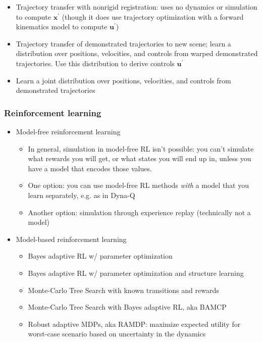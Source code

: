 \documentclass[12pt]{article}
\begin{document}
\begin{itemize}
\item Trajectory transfer with nonrigid registration: uses no dynamics or simulation to compute $\textbf{x}^\prime$ (though it does use trajectory optimization with a forward kinematics model to compute $\textbf{u}^\prime$) \citep{Schulman2013a}
\item Trajectory transfer of demonstrated trajectories to new scene; learn a distribution over positions, velocities, and controls from warped demonstrated trajectories. Use this distribution to derive controls $\textbf{u}^\prime$ \citep{Lee2015}
\item Learn a joint distribution over positions, velocities, and controls from demonstrated trajectories \citep{Paraschos2015}
\end{itemize}

\subsubsection*{Reinforcement learning}

\begin{itemize}
\item Model-free reinforcement learning
    \begin{itemize}
    \item In general, simulation in model-free RL isn't possible: you can't simulate what rewards you will get, or what states you will end up in, unless you have a model that encodes those values.
    \item One option: you can use model-free RL methods \textit{with} a model that you learn separately, e.g. as in Dyna-Q \citep{Sutton1998}
    \item Another option: simulation through experience replay (technically not a model) \citep{Mnih2015}
    \end{itemize}

\item Model-based reinforcement learning
    \begin{itemize}
    \item Bayes adaptive RL w/ parameter optimization \citep{Dearden1999}
    \item Bayes adaptive RL w/ parameter optimization and structure learning \citep{Ross2008}
    \item Monte-Carlo Tree Search with known transitions and rewards \citep{Browne2012}
    \item Monte-Carlo Tree Search with Bayes adaptive RL, aka BAMCP \citep{Guez2013}
    \item Robust adaptive MDPs, aka RAMDP: maximize expected utility for worst-case scenario based on uncertainty in the dynamics \citep{Bertuccelli2012}
    \end{itemize}
\end{itemize}
\end{document}
